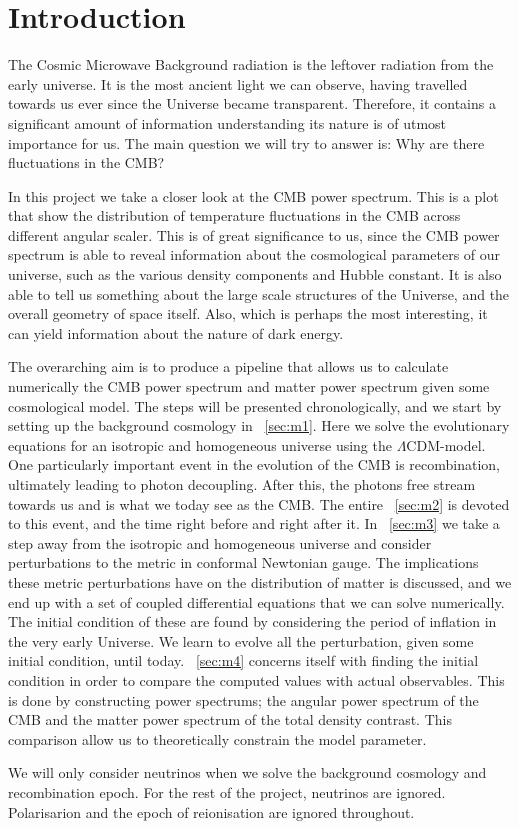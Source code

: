 \section{Introduction}\label{sec:introduction}

The Cosmic Microwave Background radiation is the leftover radiation from the early universe. It is the most ancient light we can observe, having travelled towards us ever since the Universe became transparent. Therefore, it contains a significant amount of information understanding its nature is of utmost importance for us. The main question we will try to answer is: Why are there fluctuations in the CMB? 

In this project we take a closer look at the CMB power spectrum. This is a plot that show the distribution of temperature fluctuations in the CMB across different angular scaler. This is of great significance to us, since the CMB power spectrum is able to reveal information about the cosmological parameters of our universe, such as the various density components and Hubble constant. It is also able to tell us something about the large scale structures of the Universe, and the overall geometry of space itself. Also, which is perhaps the most interesting, it can yield information about the nature of dark energy. 

The overarching aim is to produce a pipeline that allows us to calculate numerically the CMB power spectrum and matter power spectrum given some cosmological model. The steps will be presented chronologically, and we start by setting up the background cosmology in ~\cref{sec:m1}. Here we solve the evolutionary equations for an isotropic and homogeneous universe using the $\Lambda$CDM-model. One particularly important event in the evolution of the CMB is recombination, ultimately leading to photon decoupling. After this, the photons free stream towards us and is what we today see as the CMB. The entire ~\cref{sec:m2} is devoted to this event, and the time right before and right after it. In ~\cref{sec:m3} we take a step away from the isotropic and homogeneous universe and consider perturbations to the metric in conformal Newtonian gauge. The implications these metric perturbations have on the distribution of matter is discussed, and we end up with a set of coupled differential equations that we can solve numerically. The initial condition of these are found by considering the period of inflation in the very early Universe. We learn to evolve all the perturbation, given some initial condition, until today. ~\cref{sec:m4} concerns itself with finding the initial condition in order to compare the computed values with actual observables. This is done by constructing power spectrums; the angular power spectrum of the CMB and the matter power spectrum of the total density contrast. This comparison allow us to theoretically constrain the model parameter.  

We will only consider neutrinos when we solve the background cosmology and recombination epoch. For the rest of the project, neutrinos are ignored. Polarisarion and the epoch of reionisation are ignored throughout. 